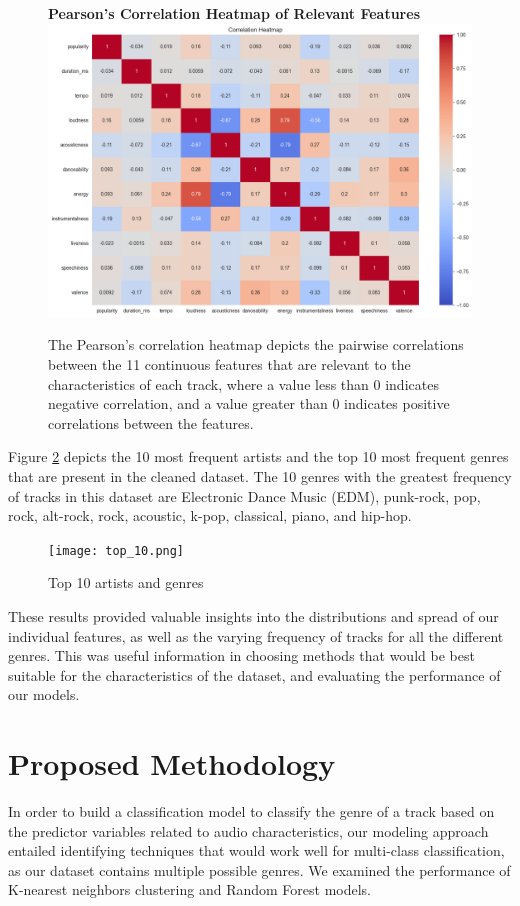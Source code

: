 \documentclass[times, twocolumn]{article}
\begin{document}
\begin{figure}[H]
    \centering
    \textbf{Pearson's Correlation Heatmap of Relevant Features}
    \includegraphics[width=1.0\linewidth]{corr_heatmap.png}
    \caption{The Pearson's correlation heatmap depicts the pairwise correlations between the 11  continuous features that are relevant to the characteristics of each track, where a value less than 0 indicates negative correlation, and a value greater than 0 indicates positive correlations between the features.}
    \label{heatmap}
\end{figure}

Figure \ref{top10} depicts the 10 most frequent artists and the top 10 most frequent genres that are present in the cleaned dataset. The 10 genres with the greatest frequency of tracks in this dataset are Electronic Dance Music (EDM), punk-rock, pop, rock, alt-rock, rock, acoustic, k-pop, classical, piano, and hip-hop. 

\begin{figure}[H]
    \centering
    \texttt{[image: top\_10.png]}
    \caption{Top 10 artists and genres}
    \label{top10}
\end{figure}

These results provided valuable insights into the distributions and spread of our individual features, as well as the varying frequency of tracks for all the different genres. This was useful information in choosing methods that would be best suitable for the characteristics of the dataset, and evaluating the performance of our models.

\section{Proposed Methodology}
In order to build a classification model to classify the genre of a track based on the predictor variables related to audio characteristics, our modeling approach entailed identifying techniques that would work well for multi-class classification, as our dataset contains multiple possible genres. We examined the performance of K-nearest neighbors clustering and Random Forest models.
\end{document}
